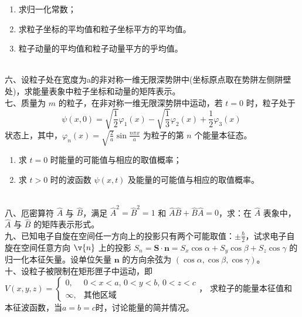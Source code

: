 \begin{enumerate}
    \item 求归一化常数；
    \item 求粒子坐标的平均值和粒子坐标平方的平均值。
    \item 粒子动量的平均值和粒子动量平方的乎均值。
\end{enumerate}\\
六、设粒子处在宽度为a的非对称一维无限深势阱中(坐标原点取在势阱左侧阱壁处)，求能量表象中粒子坐标和动量的矩阵表示。\\
七、质量为 $m$ 的粒子，在非对称一维无限深势阱中运动，若 $t=0$ 时，粒子处于
\[
\psi(x,0) = \sqrt{\frac{1}{2}} \varphi_1(x) - \sqrt{\frac{1}{3}} \varphi_2(x) + \frac{1}{2} \varphi_3(x)~
\]
状态上，其中，$\varphi_n(x) = \sqrt{\frac{2}{a}} \sin \frac{n\pi x}{a}$ 为粒子的第 $n$ 个能量本征态。

\begin{enumerate}
    \item 求 $t=0$ 时能量的可能值与相应的取值概率；
    \item 求 $t>0$ 时的波函数 $\psi(x,t)$ 及能量的可能值与相应的取值概率。
\end{enumerate}\\
八、厄密算符 $\hat{A}$ 与 $\hat{B}$，满足 $\hat{A}^2 = \hat{B}^2 = 1$ 和 $\hat{A}\hat{B} + \hat{B}\hat{A} = 0$，求：在 $\hat{A}$ 表象中，$\hat{A}$ 与 $\hat{B}$ 的矩阵表示形式。\\
九、已知电子自旋在空间任一方向上的投影只有两个可能取值：$\pm \frac{\hbar}{2}$，试求电子自旋在空间任意方向 $\v{n}$ 上的投影 $S_n = \mathbf{S} \cdot \mathbf{n} = S_x \cos \alpha + S_y \cos \beta + S_z \cos \gamma$ 的归一化本征矢量。设单位矢量 $\mathbf{n}$ 的方向余弦为 $(\cos \alpha, \cos \beta, \cos \gamma)$。\\
十、设粒子被限制在矩形匣子中运动，即 $V(x,y,z) = 
\begin{cases} 
0, & 0 < x < a, \, 0 < y < b, \, 0 < z < c \\
\infty, & \text{其他区域}
\end{cases}$，
求粒子的能量本征值和本征波函数，当$a=b=c$时，讨论能量的简并情况。